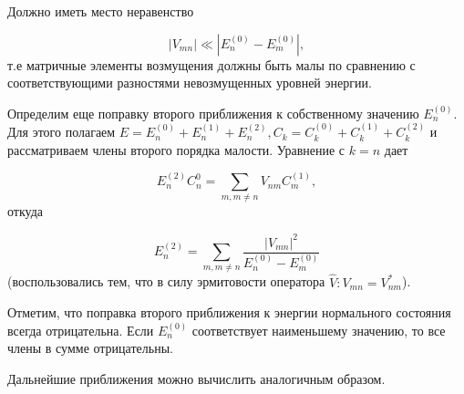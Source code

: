 Должно иметь место  неравенство

$$|V_{mn}|\ll|E_n^{(0)}-E_m^{(0)}|,$$
т.е матричные элементы возмущения должны быть малы по сравнению с соответствующими разностями невозмущенных уровней энергии.

Определим еще поправку второго приближения к собственному значению $E_n^{(0)}$. Для этого полагаем $E=E_n^{(0)}+E_n^{(1)}+E_n^{(2)}, C_k=C_k^{(0)}+C_k^{(1)}+C_k^{(2)}$ и рассматриваем члены второго порядка малости. Уравнение с $k=n$ дает

$$E_n^{(2)}C_n^0=\sum_{m,m\neq n} V_{nm}C_m^{(1)},$$
откуда

$$E_n^{(2)}=\sum_{m,m\neq n} \frac{|V_{mn}|^2}{E_n^{(0)}-E_m^{(0)}}$$
(воспользовались тем, что в силу эрмитовости оператора $\widehat{V}: V_{mn}=V_{nm}^*$).

Отметим, что поправка второго приближения к энергии нормального состояния всегда отрицательна. Если $E_n^{(0)}$ соответствует наименьшему значению, то все члены в сумме отрицательны.

Дальнейшие приближения можно вычислить аналогичным образом.
